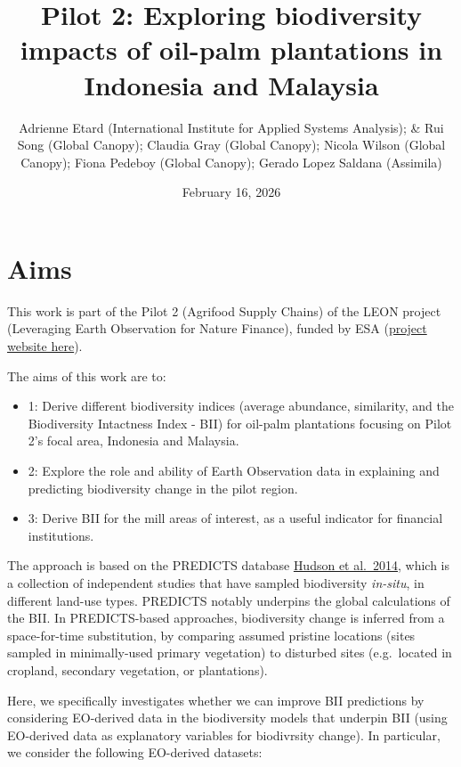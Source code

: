 \documentclass[
  letterpaper,
  DIV=11,
  numbers=noendperiod]{scrartcl}
\title{Pilot 2: Exploring biodiversity impacts of oil-palm plantations
in Indonesia and Malaysia}
\author{Adrienne Etard (International Institute for Applied Systems
Analysis); \& Rui Song (Global Canopy); Claudia Gray (Global Canopy);
Nicola Wilson (Global Canopy); Fiona Pedeboy (Global Canopy); Gerado
Lopez Saldana (Assimila)}
\date{February 16, 2026}
\begin{document}
\maketitle
\ifdefined\Shaded\renewenvironment{Shaded}{\begin{tcolorbox}[sharp corners, interior hidden, borderline west={3pt}{0pt}{shadecolor}, breakable, enhanced, boxrule=0pt, frame hidden]}{\end{tcolorbox}}\fi

\hypertarget{aims}{%
\section{Aims}\label{aims}}

This work is part of the Pilot 2 (Agrifood Supply Chains) of the LEON
project (Leveraging Earth Observation for Nature Finance), funded by ESA
(\href{https://www.leon-naturefinance.org/}{project website here}).

The aims of this work are to:

\begin{itemize}
\item
  1: Derive different biodiversity indices (average abundance,
  similarity, and the Biodiversity Intactness Index - BII) for oil-palm
  plantations focusing on Pilot 2's focal area, Indonesia and Malaysia.
\item
  2: Explore the role and ability of Earth Observation data in
  explaining and predicting biodiversity change in the pilot region.
\item
  3: Derive BII for the mill areas of interest, as a useful indicator
  for financial institutions.
\end{itemize}

The approach is based on the PREDICTS database
\href{https://onlinelibrary.wiley.com/doi/full/10.1002/ece3.1303}{Hudson
et al.~2014}, which is a collection of independent studies that have
sampled biodiversity \emph{in-situ}, in different land-use types.
PREDICTS notably underpins the global calculations of the BII. In
PREDICTS-based approaches, biodiversity change is inferred from a
space-for-time substitution, by comparing assumed pristine locations
(sites sampled in minimally-used primary vegetation) to disturbed sites
(e.g.~located in cropland, secondary vegetation, or plantations).

Here, we specifically investigates whether we can improve BII
predictions by considering EO-derived data in the biodiversity models
that underpin BII (using EO-derived data as explanatory variables for
biodivrsity change). In particular, we consider the following EO-derived
datasets:
\end{document}
